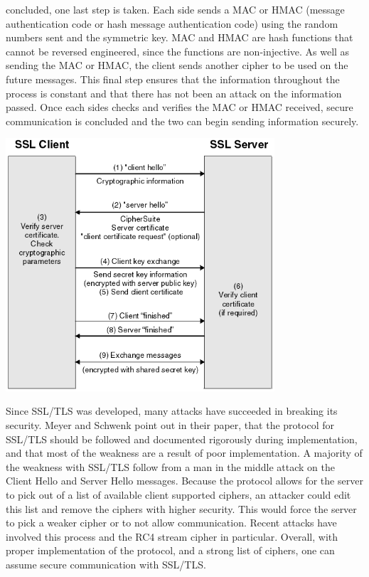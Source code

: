 concluded, one last step is taken.  Each side sends a MAC or HMAC (message
authentication code or hash message authentication code) using the random
numbers sent and the symmetric key.  MAC and HMAC are hash functions that
cannot be reversed engineered, since the functions are non-injective.  As well
as sending the MAC or HMAC, the client sends another cipher to be used on the
future messages.  This final step ensures that the information throughout the
process is constant and that there has not been an attack on the information
passed.  Once each sides checks and verifies the MAC or HMAC received, secure
communication is concluded and the two can begin sending information
securely\cite[p. 58]{rescorla}.

\begin{center}
    \includegraphics[width=0.75\textwidth]{SSL_TLS_Diagram.png}
\end{center}

Since SSL/TLS was developed, many attacks have succeeded in breaking its
security.  Meyer and Schwenk point out in their paper, that the protocol for
SSL/TLS should be followed and documented rigorously during implementation, and
that most of the weakness are a result of poor implementation\cite[p.
14]{meyer}.  A majority of the weakness with SSL/TLS follow from a man in the
middle attack on the Client Hello and Server Hello messages.  Because the
protocol allows for the server to pick out of a list of available client
supported ciphers, an attacker could edit this list and remove the ciphers with
higher security.  This would force the server to pick a weaker cipher or to not
allow communication.  Recent attacks have involved this process and the RC4
stream cipher in particular.  Overall, with proper implementation of the
protocol, and a strong list of ciphers,  one can assume secure communication
with SSL/TLS.
